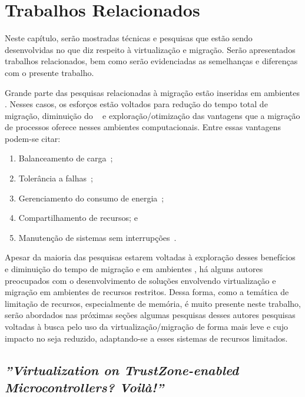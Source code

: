 \glsresetall
\chapter{Trabalhos Relacionados}
\label{chap.related-work}

Neste capítulo, serão mostradas técnicas e pesquisas que estão sendo desenvolvidas no que diz respeito à virtualização e migração. Serão apresentados trabalhos relacionados, bem como serão evidenciadas as semelhanças e diferenças com o presente trabalho.

Grande parte das pesquisas relacionadas à migração estão inseridas em ambientes \cloud. Nesses casos, os esforços estão voltados para redução do tempo total de migração, diminuição do \downtime~\cite{migration-linux-conteiners,clark2005live} e exploração/otimização das vantagens que a migração de processos oferece nesses ambientes computacionais. Entre essas vantagens podem-se citar:
\begin{enumerate}[label=(\roman*)]
    \item Balanceamento de carga~\cite{live-vm-migration-techniques,ada-things};
    \item Tolerância a falhas~\cite{fernando2019live};
    \item Gerenciamento do consumo de energia~\cite{aldossary2018performance};
    \item Compartilhamento de recursos; e
    \item Manutenção de sistemas sem interrupções~\cite{live-vm-migration-techniques,ada-things}.
\end{enumerate}

Apesar da maioria das pesquisas estarem voltadas à exploração desses benefícios e diminuição do tempo de migração e \downtime em ambientes \cloud, há alguns autores preocupados com o desenvolvimento de soluções envolvendo virtualização e migração em ambientes de recursos restritos. Dessa forma, como a temática de limitação de recursos, especialmente de memória, é muito presente neste trabalho, serão abordados nas próximas seções algumas pesquisas desses autores \ie pesquisas voltadas à busca pelo uso da virtualização/migração de forma mais leve e cujo impacto no \hardware seja reduzido, adaptando-se a esses sistemas de recursos limitados.

\section{\textit{''Virtualization on TrustZone-enabled Microcontrollers? Voilà!''}}

